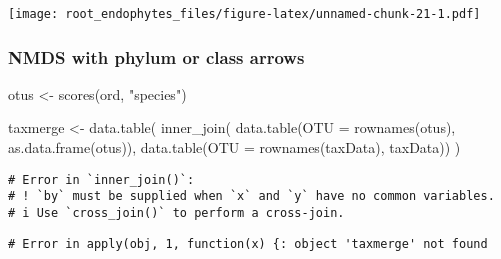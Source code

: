 \documentclass[
]{article}
\newenvironment{Shaded}{\begin{snugshade}}{\end{snugshade}}
\newcommand{\AttributeTok}[1]{\textcolor[rgb]{0.77,0.63,0.00}{#1}}
\newcommand{\DecValTok}[1]{\textcolor[rgb]{0.00,0.00,0.81}{#1}}
\newcommand{\FloatTok}[1]{\textcolor[rgb]{0.00,0.00,0.81}{#1}}
\newcommand{\FunctionTok}[1]{\textcolor[rgb]{0.00,0.00,0.00}{#1}}
\newcommand{\NormalTok}[1]{#1}
\newcommand{\OtherTok}[1]{\textcolor[rgb]{0.56,0.35,0.01}{#1}}
\newcommand{\SpecialCharTok}[1]{\textcolor[rgb]{0.00,0.00,0.00}{#1}}
\newcommand{\StringTok}[1]{\textcolor[rgb]{0.31,0.60,0.02}{#1}}
\begin{document}
\texttt{[image: root\_endophytes\_files/figure-latex/unnamed-chunk-21-1.pdf]}

\hypertarget{nmds-with-phylum-or-class-arrows}{%
\subsubsection{NMDS with phylum or class
arrows}\label{nmds-with-phylum-or-class-arrows}}

\begin{Shaded}
\begin{Highlighting}[]
\NormalTok{otus }\OtherTok{\textless{}{-}} \FunctionTok{scores}\NormalTok{(ord, }\StringTok{"species"}\NormalTok{) }

\NormalTok{taxmerge }\OtherTok{\textless{}{-}} \FunctionTok{data.table}\NormalTok{(}
  \FunctionTok{inner\_join}\NormalTok{(}
    \FunctionTok{data.table}\NormalTok{(}\AttributeTok{OTU =} \FunctionTok{rownames}\NormalTok{(otus), }\FunctionTok{as.data.frame}\NormalTok{(otus)),}
    \FunctionTok{data.table}\NormalTok{(}\AttributeTok{OTU =} \FunctionTok{rownames}\NormalTok{(taxData), taxData))}
\NormalTok{) }
\end{Highlighting}
\end{Shaded}

\begin{verbatim}
# Error in `inner_join()`:
# ! `by` must be supplied when `x` and `y` have no common variables.
# i Use `cross_join()` to perform a cross-join.
\end{verbatim}

\begin{Shaded}
\end{Shaded}

\begin{verbatim}
# Error in apply(obj, 1, function(x) {: object 'taxmerge' not found
\end{verbatim}
\end{document}
